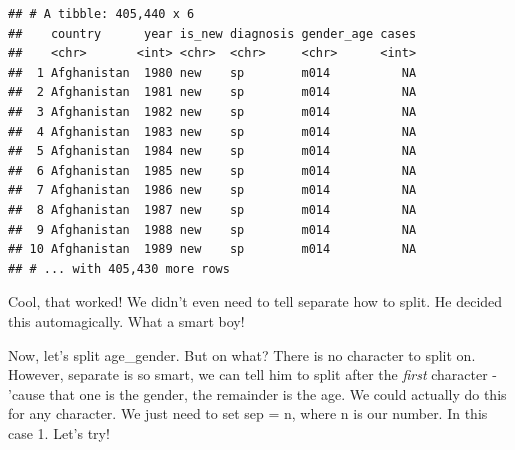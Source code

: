 \documentclass[]{tufte-book}
\newenvironment{Shaded}{}{}
\newcommand{\DataTypeTok}[1]{\textcolor[rgb]{0.56,0.13,0.00}{#1}}
\newcommand{\DecValTok}[1]{\textcolor[rgb]{0.25,0.63,0.44}{#1}}
\newcommand{\KeywordTok}[1]{\textcolor[rgb]{0.00,0.44,0.13}{\textbf{#1}}}
\newcommand{\NormalTok}[1]{#1}
\newcommand{\OperatorTok}[1]{\textcolor[rgb]{0.40,0.40,0.40}{#1}}
\newcommand{\StringTok}[1]{\textcolor[rgb]{0.25,0.44,0.63}{#1}}
\begin{document}
\begin{verbatim}
## # A tibble: 405,440 x 6
##    country      year is_new diagnosis gender_age cases
##    <chr>       <int> <chr>  <chr>     <chr>      <int>
##  1 Afghanistan  1980 new    sp        m014          NA
##  2 Afghanistan  1981 new    sp        m014          NA
##  3 Afghanistan  1982 new    sp        m014          NA
##  4 Afghanistan  1983 new    sp        m014          NA
##  5 Afghanistan  1984 new    sp        m014          NA
##  6 Afghanistan  1985 new    sp        m014          NA
##  7 Afghanistan  1986 new    sp        m014          NA
##  8 Afghanistan  1987 new    sp        m014          NA
##  9 Afghanistan  1988 new    sp        m014          NA
## 10 Afghanistan  1989 new    sp        m014          NA
## # ... with 405,430 more rows
\end{verbatim}

Cool, that worked! We didn't even need to tell separate how to split. He decided this automagically. What a smart boy!

Now, let's split age\_gender. But on what? There is no character to split on. However, separate is so smart, we can tell him to split after the \emph{first} character - 'cause that one is the gender, the remainder is the age. We could actually do this for any character. We just need to set sep = n, where n is our number. In this case 1. Let's try!

\begin{Shaded}
\end{Shaded}
\end{document}
